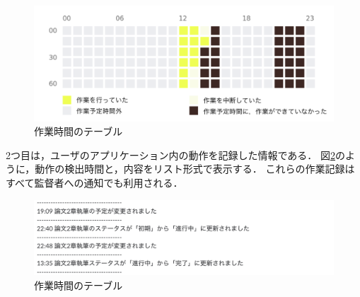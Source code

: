 \begin{figure}[h]
  \begin{center}
  \includegraphics[width=12.0cm]{graphics/activity_table.png}
  \caption{作業時間のテーブル}
  \label{fig:activity_table}
  \end{center}
\end{figure}

2つ目は，ユーザのアプリケーション内の動作を記録した情報である．
図\ref{fig:activity_log}のように，動作の検出時間と，内容をリスト形式で表示する．
これらの作業記録はすべて監督者への通知でも利用される．

\begin{figure}[h]
  \begin{center}
  \includegraphics[width=14.0cm]{graphics/activity_log.png}
  \caption{作業時間のテーブル}
  \label{fig:activity_log}
  \end{center}
\end{figure}
